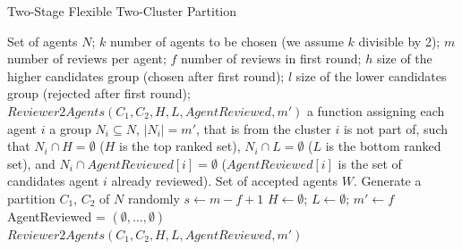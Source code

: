 \documentclass[letterpaper]{article} %
\newcommand{\omer}[1]{\textcolor{red}{\textbf{Omer Says:} #1 }}
\begin{document}
\begin{algorithm}[t]
\small
\caption{Two-Stage Flexible Two-Cluster Partition}\label{2StageFlexPartition}
\begin{algorithmic}[1]
\Require
Set of agents $N$; %
$k$ number of agents to be chosen (we assume $k$ divisible by 2); 
\newline
$m$ number of reviews per agent;
\newline
$f$ number of reviews in first round;
\newline
$h$ size of the higher candidates group (chosen after first round);
\newline
$l$ size of the lower candidates group (rejected after first round); 
\newline
$Reviewer2Agents(C_{1},C_{2},H,L,AgentReviewed,m')$ a function assigning each agent $i$ a group $N_{i}\subseteq N$, $|N_{i}|=m'$, that is from the cluster $i$ is not part of, such that $N_{i}\cap H=\emptyset$ ($H$ is the top ranked set), $N_{i}\cap L=\emptyset$ ($L$ is the bottom ranked set), and $N_{i}\cap AgentReviewed[i]=\emptyset$ ($AgentReviewed[i]$ is the set of candidates agent $i$ already reviewed).
\newline
\Ensure Set of accepted agents $W$.
\State Generate a partition {$C_{1}$, $C_{2}$} of $N$ randomly
\State $s \gets m - f + 1$ 
\State $H \gets \emptyset$; 
\State $L \gets \emptyset$; 
\State $m' \gets f$ 
\State AgentReviewed = $(\emptyset , \ldots , \emptyset)$
 \State $Reviewer2Agents(C_{1},C_{2},H,L,AgentReviewed,m')$

\end{algorithmic}
\end{algorithm}
\end{document}
